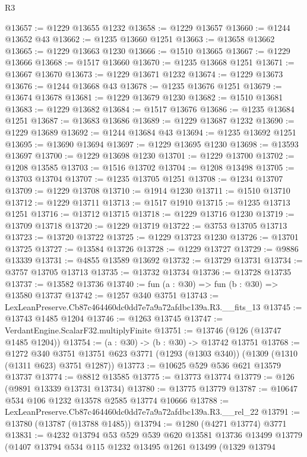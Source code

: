 \begin{lexlean}{R3}
\begin{coremodule}
@13657 := @1229 @13655 @1232
@13658 := @1229 @13657
@13660 := @1244 @13652 @43
@13662 := @1235 @13660 @1251
@13663 := @13658 @13662
@13665 := @1229 @13663 @1230
@13666 := @1510 @13665
@13667 := @1229 @13666
@13668 := @1517 @13660
@13670 := @1235 @13668 @1251
@13671 := @13667 @13670
@13673 := @1229 @13671 @1232
@13674 := @1229 @13673
@13676 := @1244 @13668 @43
@13678 := @1235 @13676 @1251
@13679 := @13674 @13678
@13681 := @1229 @13679 @1230
@13682 := @1510 @13681
@13683 := @1229 @13682
@13684 := @1517 @13676
@13686 := @1235 @13684 @1251
@13687 := @13683 @13686
@13689 := @1229 @13687 @1232
@13690 := @1229 @13689
@13692 := @1244 @13684 @43
@13694 := @1235 @13692 @1251
@13695 := @13690 @13694
@13697 := @1229 @13695 @1230
@13698 := @13593 @13697
@13700 := @1229 @13698 @1230
@13701 := @1229 @13700
@13702 := @1208 @13585
@13703 := @1516 @13702
@13704 := @1208 @13498
@13705 := @13703 @13704
@13707 := @1235 @13705 @1251
@13708 := @1234 @13707
@13709 := @1229 @13708
@13710 := @1914 @1230
@13711 := @1510 @13710
@13712 := @1229 @13711
@13713 := @1517 @1910
@13715 := @1235 @13713 @1251
@13716 := @13712 @13715
@13718 := @1229 @13716 @1230
@13719 := @13709 @13718
@13720 := @1229 @13719
@13722 := @3753 @13705 @13713
@13723 := @13720 @13722
@13725 := @1229 @13723 @1230
@13726 := @13701 @13725
@13727 := @13584 @13726
@13728 := @1229 @13727
@13729 := @9886 @13339
@13731 := @4855 @13589 @13692
@13732 := @13729 @13731
@13734 := @3757 @13705 @13713
@13735 := @13732 @13734
@13736 := @13728 @13735
@13737 := @13582 @13736
@13740 := fun (a : @30) => fun (b : @30) => @13580 @13737
@13742 := @1257 @340 @3751
@13743 := LexLeanPreserve.Cb87c464460dc0dd7e7a9a72afdbc139a.R3.__fits_13
@13745 := @13743 @1485 @1204
@13746 := @1263 @13745
@13747 := VerdantEngine.ScalarF32.multiplyFinite
@13751 := @13746 (@126 (@13747 @1485 @1204))
@13754 := (a : @30) -> (b : @30) -> @13742 @13751
@13768 := @1272
    @340
    @3751
    @13751
    @623
    @3771
    (@1293 (@1303 @340))
    (@1309 (@1310 (@1311 @623) @3751 @1287))
@13773 := @10625 @529 @536 @621 @13579 @13737
@13774 := @8812 @13585
@13775 := @13773 @13774
@13779 := @126 (@9891 @13339 @13731 @13734)
@13780 := @13775 @13779
@13787 := @10647 @534 @106 @1232 @13578 @2585 @13774 @10666
@13788 := LexLeanPreserve.Cb87c464460dc0dd7e7a9a72afdbc139a.R3.__rel_22
@13791 := @13780 (@13787 (@13788 @1485))
@13794 := @1280 (@4271 @13774) @3771
@13831 := @4232
    @13794
    @53
    @529
    @539
    @620
    @13581
    @13736
    @13499
    @13779
    (@1407
      @13794
      @534
      @115
      @1232
      @13495
      @1261
      @13499
      (@1329
        @13794

\end{coremodule}
\end{lexlean}
